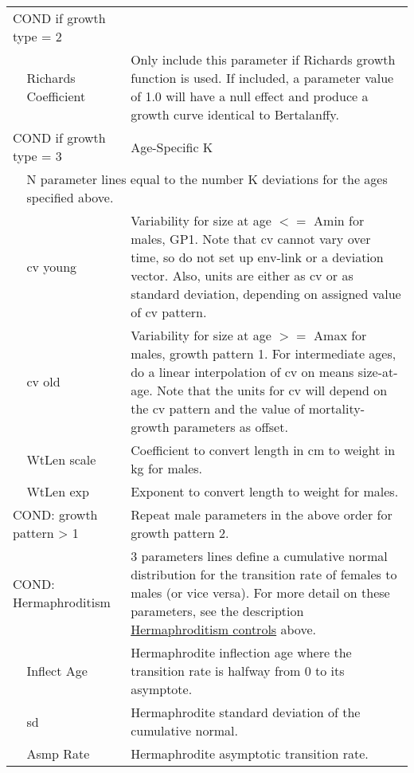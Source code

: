 \begin{longtable}{p{1cm} p{2.25cm} p{10cm}}
	\multicolumn{2}{l}{COND if growth type = 2} & \Tstrut\\
	& Richards Coefficient & Only include this parameter if Richards growth function is used. If included, a parameter value of 1.0 will have a null effect and produce a growth curve identical to Bertalanffy. \\
	\multicolumn{2}{l}{COND if growth type = 3} & Age-Specific K \\
	& \multicolumn{2}{l}{N parameter lines equal to the number K deviations for the ages specified above.} \Bstrut\\
	\hline

	\Tstrut & \gls{cv} young & Variability for size at age $<=$ Amin for males, GP1. Note that \gls{cv} cannot vary over time, so do not set up env-link or a deviation vector. Also, units are either as \gls{cv} or as standard deviation, depending on assigned value of \gls{cv} pattern. \\
	& \gls{cv} old & Variability for size at age $>=$ Amax for males, growth pattern 1. For intermediate ages, do a linear interpolation of \gls{cv} on means size-at-age. Note that the units for \gls{cv} will depend on the \gls{cv} pattern and the value of mortality-growth parameters as offset. \\
	\hline

	\Tstrut & WtLen scale & Coefficient to convert length in cm to weight in kg for males. \\
	& WtLen exp & Exponent to convert length to weight for males. \Bstrut\\

	\multicolumn{2}{l}{COND: growth pattern > 1} \Tstrut & Repeat male parameters in the above order for growth pattern 2. \\
	\hline

	\multicolumn{2}{l}{\hypertarget{HermaphroditeBiology}{COND: Hermaphroditism}} \Tstrut & 3 parameters lines define a cumulative normal distribution for the transition rate of females to males (or vice versa). For more detail on these parameters, see the description \hyperlink{Hermaphroditism}{Hermaphroditism controls} above.\\
	& Inflect Age & Hermaphrodite inflection age where the transition rate is halfway from 0 to its asymptote. \\
	& \gls{sd} & Hermaphrodite standard deviation of the cumulative normal. \\
	& Asmp Rate & Hermaphrodite asymptotic transition rate. \Bstrut\\
	\hline


\end{longtable}

